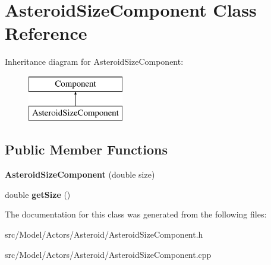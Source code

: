 \hypertarget{classAsteroidSizeComponent}{}\section{Asteroid\+Size\+Component Class Reference}
\label{classAsteroidSizeComponent}
Inheritance diagram for Asteroid\+Size\+Component\+:\begin{figure}[H]
\begin{center}
\leavevmode
\includegraphics[height=2.000000cm]{classAsteroidSizeComponent}
\end{center}
\end{figure}
\subsection*{Public Member Functions}
\begin{DoxyCompactItemize}
\item 
{\bfseries Asteroid\+Size\+Component} (double size)\hypertarget{classAsteroidSizeComponent_a75c6bbd15b0aac22e48d5bda8ecaba22}{}\label{classAsteroidSizeComponent_a75c6bbd15b0aac22e48d5bda8ecaba22}

\item 
double {\bfseries get\+Size} ()\hypertarget{classAsteroidSizeComponent_a02117cd143700e333623eb0e25dfea32}{}\label{classAsteroidSizeComponent_a02117cd143700e333623eb0e25dfea32}

\end{DoxyCompactItemize}


The documentation for this class was generated from the following files\+:\begin{DoxyCompactItemize}
\item 
src/\+Model/\+Actors/\+Asteroid/Asteroid\+Size\+Component.\+h\item 
src/\+Model/\+Actors/\+Asteroid/Asteroid\+Size\+Component.\+cpp\end{DoxyCompactItemize}
